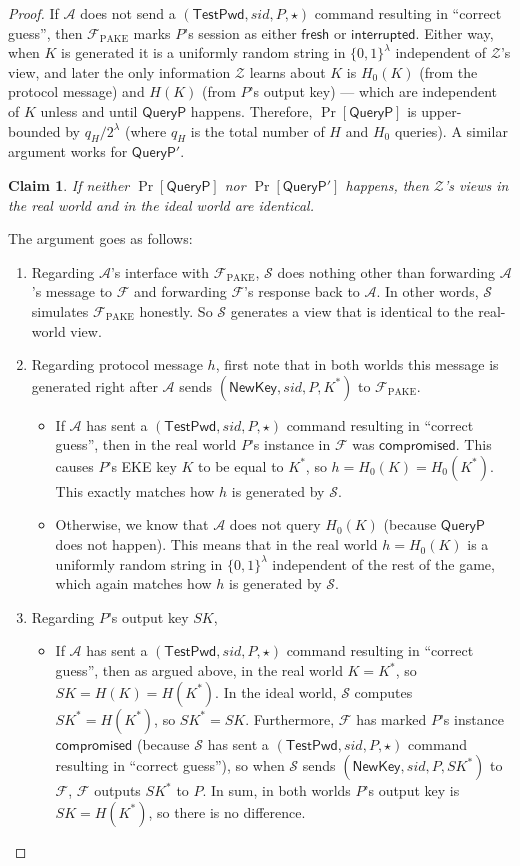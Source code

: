 \documentclass{article}
\newtheorem{claim}{Claim}
\newcommand{\adv}{\mathcal{A}}
\newcommand{\env}{\mathcal{Z}}
\renewcommand{\sim}{\mathcal{S}}
\newcommand{\func}{\mathcal{F}}
\newcommand{\Fpake}{\func_\mathrm{PAKE}}
\newcommand{\TestPwd}{\mathsf{TestPwd}}
\newcommand{\NewKey}{\mathsf{NewKey}}
\newcommand{\fresh}{\mathsf{fresh}}
\newcommand{\compromised}{\mathsf{compromised}}
\newcommand{\interrupted}{\mathsf{interrupted}}
\begin{document}
\begin{proof}
If $\adv$ does not send a $(\TestPwd, sid, P, \star)$ command resulting in ``correct guess'', then $\Fpake$ marks $P$'s session as either $\fresh$ or $\interrupted$. Either way, when $K$ is generated it is a uniformly random string in $\{0,1\}^\lambda$ independent of $\env$'s view, and later the only information $\env$ learns about $K$ is $H_0(K)$ (from the protocol message) and $H(K)$ (from $P$'s output key) --- which are independent of $K$ unless and until $\mathsf{QueryP}$ happens. Therefore, $\Pr[\mathsf{QueryP}]$ is upper-bounded by $q_H/2^\lambda$ (where $q_H$ is the total number of $H$ and $H_0$ queries). A similar argument works for $\mathsf{QueryP'}$.
\begin{claim}
If neither $\Pr[\mathsf{QueryP}]$ nor $\Pr[\mathsf{QueryP'}]$ happens, then $\env$'s views in the real world and in the ideal world are identical.
\end{claim}
The argument goes as follows:
\begin{enumerate}
  \item Regarding $\adv$'s interface with $\Fpake$, $\sim$ does nothing other than forwarding $\adv$'s message to $\func$ and forwarding $\func$'s response back to $\adv$. In other words, $\sim$ simulates $\Fpake$ honestly. So $\sim$ generates a view that is identical to the real-world view.
  \item Regarding protocol message $h$, first note that in both worlds this message is generated right after $\adv$ sends $(\NewKey, sid, P, K^*)$ to $\Fpake$.
      \begin{itemize}
        \item If $\adv$ has sent a $(\TestPwd, sid, P, \star)$ command resulting in ``correct guess'', then in the real world $P$'s instance in $\func$ was $\compromised$. This causes $P$'s EKE key $K$ to be equal to $K^*$, so $h = H_0(K) = H_0(K^*)$. This exactly matches how $h$ is generated by $\sim$.
        \item Otherwise, we know that $\adv$ does not query $H_0(K)$ (because $\mathsf{QueryP}$ does not happen). This means that in the real world $h = H_0(K)$ is a uniformly random string in $\{0,1\}^\lambda$ independent of the rest of the game, which again matches how $h$ is generated by $\sim$.
      \end{itemize}
  \item Regarding $P$'s output key $SK$,
      \begin{itemize}
        \item If $\adv$ has sent a $(\TestPwd, sid, P, \star)$ command resulting in ``correct guess'', then as argued above, in the real world $K = K^*$, so $SK = H(K) = H(K^*)$. In the ideal world, $\sim$ computes $SK^* = H(K^*)$, so $SK^* = SK$. Furthermore, $\func$ has marked $P$'s instance $\compromised$ (because $\sim$ has sent a $(\TestPwd, sid, P, \star)$ command resulting in ``correct guess''), so when $\sim$ sends $(\NewKey, sid, P, SK^*)$ to $\func$, $\func$ outputs $SK^*$ to $P$. In sum, in both worlds $P$'s output key is $SK = H(K^*)$, so there is no difference.

\end{itemize}
\end{enumerate}
\end{proof}
\end{document}
